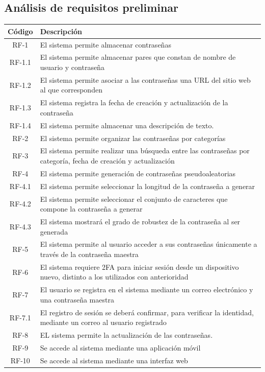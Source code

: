 \documentclass{article}
\begin{document}
\subsection{Análisis de requisitos preliminar}

\begin{table}[H]
    \centering
    \begin{tabular}{| c | p{30em} |}
    \hline
        Código &  Descripción  \\ \hline
        RF-1 & El sistema permite almacenar contraseñas \\ \hline
        RF-1.1 & El sistema permite almacenar pares que constan de nombre de usuario y contraseña  \\ \hline
        RF-1.2 & El sistema permite asociar a las contraseñas una URL del sitio web al que corresponden \\ \hline
        RF-1.3 & El sistema registra la fecha de creación y actualización de la contraseña \\ \hline
        RF-1.4 & El sistema permite almacenar una descripción de texto. \\ \hline
        RF-2 & El  sistema permite organizar las contraseñas por categorías \\ \hline
        RF-3 & El sistema permite realizar una búsqueda entre las contraseñas por categoría, fecha de creación y actualización  \\ \hline
        RF-4 & El sistema permite generación de contraseñas pseudoaleatorias \\ \hline
        RF-4.1 & El sistema permite seleccionar la longitud de la contraseña a generar\\ \hline
        RF-4.2 & El sistema permite seleccionar el conjunto de caracteres que compone la contraseña a generar\\ \hline
        RF-4.3 & El sistema mostrará el grado de robustez de la contraseña al ser generada \\ \hline
        RF-5 & El sistema permite al usuario acceder a sus contraseñas únicamente a través de la contraseña maestra \\ \hline
        RF-6 & El sistema requiere 2FA para iniciar sesión desde un dispositivo nuevo, distinto a los utilizados con anterioridad \\ \hline
        RF-7 & El usuario se registra en el sistema mediante un correo electrónico y una contraseña maestra\\ \hline
        RF-7.1 & El registro de sesión se deberá confirmar, para verificar la identidad, mediante un correo al usuario registrado \\ \hline
        RF-8 & EL sistema permite la actualización de las contraseñas. \\ \hline
        RF-9 & Se accede al sistema mediante una aplicación móvil \\ \hline
        RF-10 & Se accede al sistema mediante una interfaz web \\ \hline
    \end{tabular}
\end{table}
\end{document}
